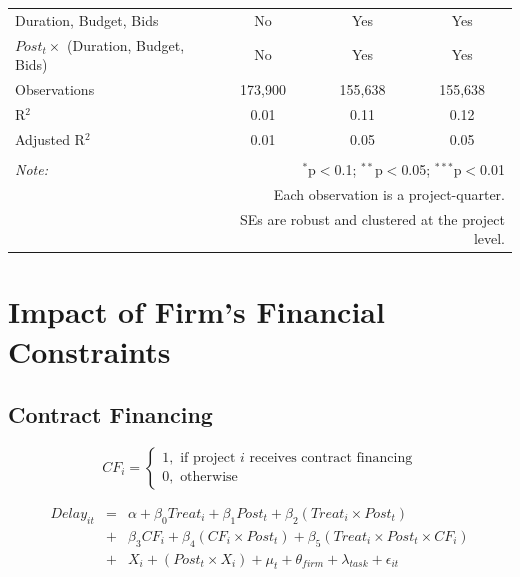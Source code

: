 \documentclass[
]{article}
\begin{document}
\begin{table}[H]
\begin{tabular}{@{\extracolsep{-2pt}}lccc}
Duration, Budget, Bids & No & Yes & Yes \\ 
$Post_t \times$  (Duration, Budget, Bids) & No & Yes & Yes \\ 
Observations & 173,900 & 155,638 & 155,638 \\ 
R$^{2}$ & 0.01 & 0.11 & 0.12 \\ 
Adjusted R$^{2}$ & 0.01 & 0.05 & 0.05 \\ 
\hline 
\hline \\[-1.8ex] 
\textit{Note:}  & \multicolumn{3}{r}{$^{*}$p$<$0.1; $^{**}$p$<$0.05; $^{***}$p$<$0.01} \\ 
 & \multicolumn{3}{r}{Each observation is a project-quarter.} \\ 
 & \multicolumn{3}{r}{SEs are robust and clustered at the project level.} \\ 
\end{tabular} 
\end{table}

\hypertarget{impact-of-firms-financial-constraints}{%
\section{Impact of Firm's Financial
Constraints}\label{impact-of-firms-financial-constraints}}

\hypertarget{contract-financing}{%
\subsection{Contract Financing}\label{contract-financing}}

\[ CF_i = \begin{cases} 1, \text{ if project } i \text{ receives contract financing}\\
0, \text{ otherwise} \end{cases}\]

\[ \begin{aligned}
Delay_{it} &=& \alpha+\beta_0 Treat_i + \beta_1 Post_t + \beta_2 (Treat_i \times Post_t) \\
&+&\beta_3 CF_i + \beta_4 (CF_i \times Post_t) + \beta_5 (Treat_i \times Post_t \times CF_i) \\ 
&+&X_i + (Post_t \times X_i) + \mu_t + \theta_{firm} + \lambda_{task}+ \epsilon_{it}
\end{aligned}\]
\end{document}

